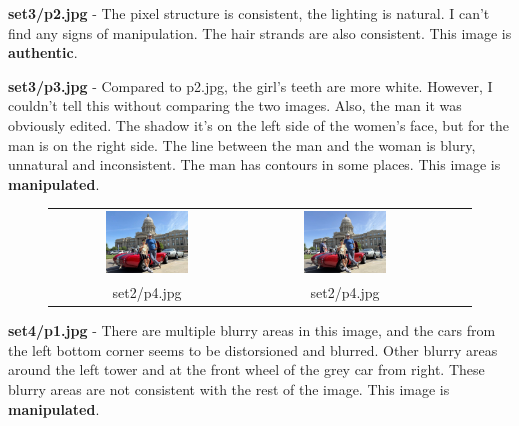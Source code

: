 \documentclass[pdflatex,sn-mathphys-num]{sn-jnl}
\begin{document}
\par \textbf{set3/p2.jpg} \-- The pixel structure is consistent, the lighting is natural. I can't find any signs of
manipulation. The hair strands are also consistent. This image is \textbf{authentic}.

\par \textbf{set3/p3.jpg} \-- Compared to p2.jpg, the girl's teeth are more white. However, I couldn't tell this without
comparing the two images. Also, the man it was obviously edited. The shadow it's on the left side of the women's face,
but for the man is on the right side. The line between the man and the woman is blury, unnatural and inconsistent. The
man has contours in some places. This image is \textbf{manipulated}.

\begin{figure}[H]
    \centering
    \begin{tabular}{cccc}
        \includegraphics[width=0.45\textwidth]{images/set4/p1.jpg} &
        \includegraphics[width=0.45\textwidth]{images/set4/p2.jpg} \\
        set2/p4.jpg & set2/p4.jpg
    \end{tabular}
    \label{fig:set4_images}
\end{figure}

\par \textbf{set4/p1.jpg} \-- There are multiple blurry areas in this image, and the cars from the left bottom corner
seems to be distorsioned and blurred. Other blurry areas around the left tower and at the front wheel of the grey car
from right. These blurry areas are not consistent with the rest of the image. This image is \textbf{manipulated}.
\end{document}
